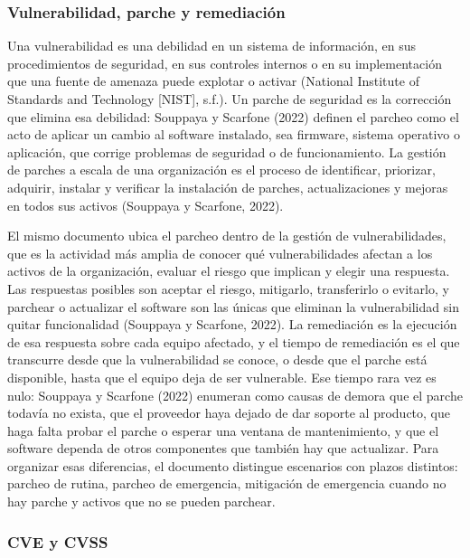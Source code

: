 \subsubsection{Vulnerabilidad, parche y remediación}
\label{subsubsec:vulnerabilidad-parche}

Una vulnerabilidad es una debilidad en un sistema de información, en sus procedimientos de
seguridad, en sus controles internos o en su implementación que una fuente de amenaza puede
explotar o activar (National Institute of Standards and Technology [NIST], s.f.). Un parche de
seguridad es la corrección que elimina esa debilidad: Souppaya y Scarfone (2022) definen el
parcheo como el acto de aplicar un cambio al software instalado, sea firmware, sistema operativo
o aplicación, que corrige problemas de seguridad o de funcionamiento. La gestión de parches a
escala de una organización es el proceso de identificar, priorizar, adquirir, instalar y
verificar la instalación de parches, actualizaciones y mejoras en todos sus activos (Souppaya y
Scarfone, 2022).

El mismo documento ubica el parcheo dentro de la gestión de vulnerabilidades, que es la
actividad más amplia de conocer qué vulnerabilidades afectan a los activos de la organización,
evaluar el riesgo que implican y elegir una respuesta. Las respuestas posibles son aceptar el
riesgo, mitigarlo, transferirlo o evitarlo, y parchear o actualizar el software son las únicas
que eliminan la vulnerabilidad sin quitar funcionalidad (Souppaya y Scarfone, 2022). La
remediación es la ejecución de esa respuesta sobre cada equipo afectado, y el tiempo de
remediación es el que transcurre desde que la vulnerabilidad se conoce, o desde que el parche
está disponible, hasta que el equipo deja de ser vulnerable. Ese tiempo rara vez es nulo:
Souppaya y Scarfone (2022) enumeran como causas de demora que el parche todavía no exista, que
el proveedor haya dejado de dar soporte al producto, que haga falta probar el parche o esperar
una ventana de mantenimiento, y que el software dependa de otros componentes que también hay que
actualizar. Para organizar esas diferencias, el documento distingue escenarios con plazos
distintos: parcheo de rutina, parcheo de emergencia, mitigación de emergencia cuando no hay
parche y activos que no se pueden parchear.

\subsubsection{CVE y CVSS}
\label{subsubsec:cve-cvss}

